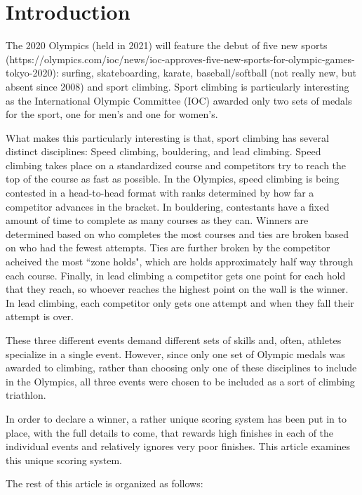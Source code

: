 \documentclass{article}\usepackage[]{graphicx}\usepackage[]{color}
\begin{document}
\section{Introduction}
The 2020 Olympics (held in 2021) will feature the debut of five new sports (https://olympics.com/ioc/news/ioc-approves-five-new-sports-for-olympic-games-tokyo-2020): surfing, skateboarding, karate, baseball/softball (not really new, but absent since 2008) and sport climbing.  Sport climbing is particularly interesting as the International Olympic Committee (IOC) awarded only two sets of medals for the sport, one for men's and one for women's.  

What makes this particularly interesting is that, sport climbing has several distinct disciplines: Speed climbing, bouldering, and lead climbing.  Speed climbing takes place on a standardized course and competitors try to reach the top of the course as fast as possible.  In the Olympics, speed climbing is being contested in a head-to-head format with ranks determined by how far a competitor advances in the bracket.   In bouldering, contestants have a fixed amount of time to complete as many courses as they can.  Winners are determined based on who completes the most courses and ties are broken based on who had the fewest attempts.  Ties are further broken by the competitor acheived the most ``zone holds", which are holds approximately half way through each course.  Finally, in lead climbing a competitor gets one point for each hold that they reach, so whoever reaches the highest point on the wall is the winner.  In lead climbing, each competitor only gets one attempt and when they fall their attempt is over.  %

These three different events demand different sets of skills and, often, athletes specialize in a single event.  However, since only one set of Olympic medals was awarded to climbing, rather than choosing only one of these disciplines to include in the Olympics, all three events were chosen to be included as a sort of climbing triathlon.  

In order to declare a winner, a rather unique scoring system has been put in to place, with the full details to come, that rewards high finishes in each of the individual events and relatively ignores very poor finishes.  This article examines this unique scoring system. 

The rest of this article is organized as follows: 
\end{document}
